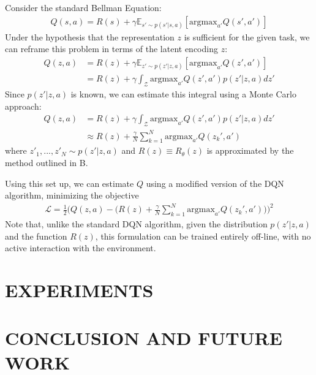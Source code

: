 \documentclass[letterpaper, 10 pt, conference]{ieeeconf}  %
\begin{document}
Consider the standard Bellman Equation:
\begin{align*}
	Q(s,a) = R(s) + \gamma\mathbb{E}_{s'\sim p(s'|s,a)}[\text{argmax}_{a'}Q(s',a')]
\end{align*}
Under the hypothesis that the representation $z$ is sufficient for the given task, we can reframe this problem in terms of the latent encoding $z$:
\begin{align*}
	Q(z,a) &= R(z) + \gamma\mathbb{E}_{z'\sim p(z'|z,a)}[\text{argmax}_{a'}Q(z',a')]\\
	&= R(z) + \gamma\int_\mathcal{Z} \text{argmax}_{a'}Q(z',a')p(z'|z,a)dz'
\end{align*}
Since $p(z'|z,a)$ is known, we can estimate this integral using a Monte Carlo approach:
\begin{align*}
	Q(z,a) &= R(z) + \gamma\int_\mathcal{Z} \text{argmax}_{a'}Q(z',a')p(z'|z,a)dz'\\
	&\approx R(z) + \frac{\gamma}{N}\sum_{k=1}^N \text{argmax}_{a'}Q(z_k',a')
\end{align*}
where $z'_1,...,z'_N \sim p(z'|z,a)$ and $R(z) \equiv R_\theta(z)$ is approximated by the method outlined in B.

Using this set up, we can estimate $Q$ using a modified version of the DQN algorithm, minimizing the objective
\begin{align*}
	\mathcal{L} = \frac{1}{2}\Big(Q(z,a)-\big(R(z) + \frac{\gamma}{N}\sum_{k=1}^N \text{argmax}_{a'}Q(z_k',a')\big)\Big)^2 
\end{align*}
Note that, unlike the standard DQN algorithm, given the distribution $p(z'|z,a)$ and the function $R(z)$, this formulation can be trained entirely off-line, with no active interaction with the environment.

\section{EXPERIMENTS}

\section{CONCLUSION AND FUTURE WORK}
\end{document}
